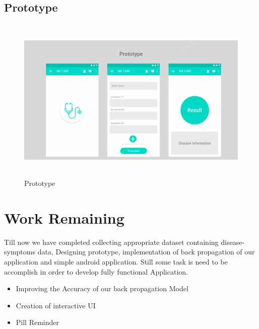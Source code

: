 {\subsection{Prototype}
\begin{figure}[H]
\begin{center}
\includegraphics[width=130mm, height = 80mm]{images/prototype.jpg}
\caption{Prototype}
\end{center}
\end{figure}


\section{Work Remaining}
Till now we have completed collecting appropriate dataset containing disease-symptoms data, Designing prototype, implementation of back propagation of our application and simple android application. Still some task is need to be accomplish in order to develop fully functional Application.
\begin{itemize}
    
\item Improving the Accuracy of our back propagation Model
\item Creation of interactive UI 
\item Pill Reminder

\end{itemize}
}
